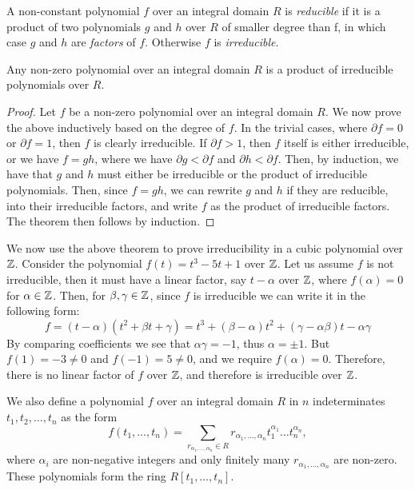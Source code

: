 \begin{definition}
     A non-constant polynomial $f$ over an integral domain $R$ is \textit{reducible} if it is a product of two polynomials $g$ and $h$ over $R$ of smaller degree than f, in which case $g$ and $h$ are \textit{factors} of $f$. Otherwise $f$ is \textit{irreducible}. 
\end{definition}

\begin{theorem}
    Any non-zero polynomial over an integral domain $R$ is a product of irreducible polynomials over $R$.
\end{theorem}

\begin{proof}
    Let $f$ be a non-zero polynomial over an integral domain $R$. We now prove the above inductively based on the degree of $f$. In the trivial cases, where $\partial f =0$ or $\partial f = 1$, then $f$ is clearly irreducible. If $\partial f > 1$, then $f$ itself is either irreducible, or we have $f=gh$, where we have $\partial g < \partial f$ and $\partial h < \partial f$. Then, by induction, we have that $g$ and $h$ must either be irreducible or the product of irreducible polynomials. Then, since $f=gh$, we can rewrite $g$ and $h$ if they are reducible, into their irreducible factors, and write $f$ as the product of irreducible factors. The theorem then follows by induction. 
    
\end{proof}

\begin{example}
    We now use the above theorem to prove irreducibility in a cubic polynomial over $\mathbb Z$. Consider the polynomial $f(t)=t^3-5t+1$ over $\mathbb Z$. Let us assume $f$ is not irreducible, then it must have a linear factor, say $t-\alpha$ over $\mathbb Z$, where $f(\alpha)=0$ for $\alpha \in \mathbb Z$. Then, for $\beta, \gamma \in \mathbb Z$, since $f$ is irreducible we can write it in the following form:
    $$f=(t-\alpha)(t^2+\beta t + \gamma) = t^3 + (\beta - \alpha)t^2 + (\gamma - \alpha \beta)t - \alpha \gamma$$
    By comparing coefficients we see that $\alpha \gamma = -1$, thus $\alpha = \pm 1$. But $f(1) = -3 \neq 0$ and $f(-1) = 5 \neq 0$, and we require $f(\alpha)=0$. Therefore, there is no linear factor of $f$ over $\mathbb Z$, and therefore is irreducible over $\mathbb Z$.
\end{example}

We also define a polynomial $f$ over an integral domain $R$ in $n$ indeterminates $t_1, t_2, \dots, t_n$ as the form 
$$
f(t_1, \dots, t_n) = \sum _{ r_{\alpha_1, \dots, \alpha_n} \in R}  r_{\alpha_1, \dots, \alpha_n} t_1^{\alpha_1} \dots t_n ^{\alpha_n},
$$
where $\alpha_i$ are non-negative integers and only finitely many $r_{\alpha_1, \dots, \alpha_n}$ are non-zero. These polynomials form the ring $R[t_1, \dots, t_n]$.

